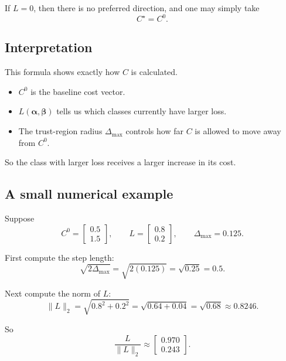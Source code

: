 \documentclass{article}
\begin{document}
If $L=0$, then there is no preferred direction, and one may simply take
\begin{equation}
C^\star = C^0.
\end{equation}

\subsection{Interpretation}

This formula shows exactly how $C$ is calculated.

\begin{itemize}
    \item $C^0$ is the baseline cost vector.
    \item $L(\boldsymbol{\alpha},\boldsymbol{\beta})$ tells us which classes currently have larger loss.
    \item The trust-region radius $\Delta_{\max}$ controls how far $C$ is allowed to move away from $C^0$.
\end{itemize}

So the class with larger loss receives a larger increase in its cost.

\subsection{A small numerical example}

Suppose
\begin{equation}
C^0=\begin{bmatrix}0.5\\1.5\end{bmatrix},
\qquad
L=\begin{bmatrix}0.8\\0.2\end{bmatrix},
\qquad
\Delta_{\max}=0.125.
\end{equation}

First compute the step length:
\begin{equation}
\sqrt{2\Delta_{\max}}
=
\sqrt{2(0.125)}
=
\sqrt{0.25}
=
0.5.
\end{equation}

Next compute the norm of $L$:
\begin{equation}
\|L\|_2
=
\sqrt{0.8^2+0.2^2}
=
\sqrt{0.64+0.04}
=
\sqrt{0.68}
\approx 0.8246.
\end{equation}

So
\begin{equation}
\frac{L}{\|L\|_2}
\approx
\begin{bmatrix}
0.970\\
0.243
\end{bmatrix}.
\end{equation}
\end{document}
